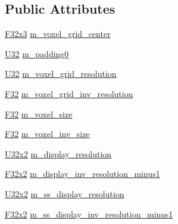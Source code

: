 \subsection*{Public Attributes}
\begin{DoxyCompactItemize}
\item 
\hyperlink{namespacemage_a73fbe0da4b8d5bc156bb8453e5b63a17}{F32x3} \hyperlink{structmage_1_1rendering_1_1_game_buffer_a4dddeeb0f0bfb8cdb328338657910f3c}{m\+\_\+voxel\+\_\+grid\+\_\+center}
\item 
\hyperlink{namespacemage_a41c104c036fba3756a74e19f793eeaa1}{U32} \hyperlink{structmage_1_1rendering_1_1_game_buffer_ac0e92071c7409a5408047bd6116da200}{m\+\_\+padding0}
\item 
\hyperlink{namespacemage_a41c104c036fba3756a74e19f793eeaa1}{U32} \hyperlink{structmage_1_1rendering_1_1_game_buffer_a705874f8b8be19a790faf47639e750a5}{m\+\_\+voxel\+\_\+grid\+\_\+resolution}
\item 
\hyperlink{namespacemage_aa97e833b45f06d60a0a9c4fc22ae02c0}{F32} \hyperlink{structmage_1_1rendering_1_1_game_buffer_a613f32740ac3e7f6b1e32f9976447b22}{m\+\_\+voxel\+\_\+grid\+\_\+inv\+\_\+resolution}
\item 
\hyperlink{namespacemage_aa97e833b45f06d60a0a9c4fc22ae02c0}{F32} \hyperlink{structmage_1_1rendering_1_1_game_buffer_a792ab7eca88d2a2f425d06df602d6e11}{m\+\_\+voxel\+\_\+size}
\item 
\hyperlink{namespacemage_aa97e833b45f06d60a0a9c4fc22ae02c0}{F32} \hyperlink{structmage_1_1rendering_1_1_game_buffer_add22463d853cd1b33c605257d44bec07}{m\+\_\+voxel\+\_\+inv\+\_\+size}
\item 
\hyperlink{namespacemage_a88e05bff0300120c013285d3dcad95c5}{U32x2} \hyperlink{structmage_1_1rendering_1_1_game_buffer_a0d1ae294ea443c48c348af75442a8f54}{m\+\_\+display\+\_\+resolution}
\item 
\hyperlink{namespacemage_aa87237ad091f5cd7da612b8523fc108f}{F32x2} \hyperlink{structmage_1_1rendering_1_1_game_buffer_a046916a46d80f979ac4f16c2ba58d8ef}{m\+\_\+display\+\_\+inv\+\_\+resolution\+\_\+minus1}
\item 
\hyperlink{namespacemage_a88e05bff0300120c013285d3dcad95c5}{U32x2} \hyperlink{structmage_1_1rendering_1_1_game_buffer_a76b01da64f8eb8f7ba431371a71d35a4}{m\+\_\+ss\+\_\+display\+\_\+resolution}
\item 
\hyperlink{namespacemage_aa87237ad091f5cd7da612b8523fc108f}{F32x2} \hyperlink{structmage_1_1rendering_1_1_game_buffer_a471b606cff83755f74f855c780c3dc2a}{m\+\_\+ss\+\_\+display\+\_\+inv\+\_\+resolution\+\_\+minus1}

\end{DoxyCompactItemize}
